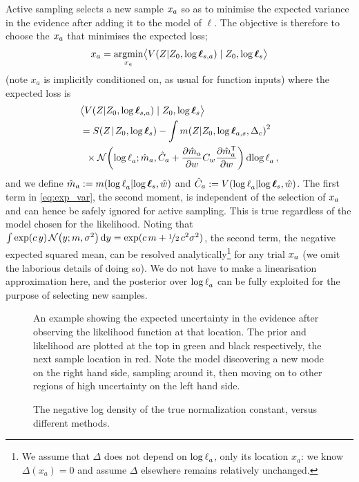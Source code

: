 \documentclass{article}
\begin{document}
Active sampling selects a new sample $\lfv_a$ so as to minimise the expected variance in the evidence after adding it to the model of $\ell$.  The objective is therefore to choose the $\lfv_a$ that minimises the expected loss;
%
\begin{align}
\lfv_a = \argmin_{\lfv_a} \bigl\langle \cov{\If}{Z_0,\tvr_{s,a}}\mid Z_0,\tvr_{s}\bigr\rangle 
\end{align}
(note $x_a$ is implicitly conditioned on, as usual for function inputs) where the expected loss is
\begin{align}
&\bigl\langle \cov{\If}{Z_0,\tvr_{s,a}}\mid Z_0,\tvr_{s}\bigr\rangle 
\nonumber\\
 & = \secm{\If}{Z_0,\tvr_s} 
 - \int\mean{\If}{Z_0,\tvr_{a,s},\Delta_c}^2\nonumber\\
& \hspace{0.2cm}
\times\N{\tr_a}
{\hat{m}_a }
{\hat{C}_a +\pderiv{\hat{m}_a}{w}C_w\pderiv{\hat{m}\tra_a}{w}}
\ud\tr_a\,,\label{eq:exp_var}
\end{align}
and we define
$\hat{m}_a \deq \mean{\tr_a}{\tvr_s,\hat{w}}$
and
$\hat{C}_a \deq \cov{\tr_a}{\tvr_s,\hat{w}}$.
The first term in \eqref{eq:exp_var}, the second moment, is independent of the selection of $\lfv_a$ and can hence  be safely ignored for active sampling. This is true regardless of the model chosen for the likelihood. 
Noting that $\int \exp(c\, y)\, \N{y}{m}{\sigma^2} \ud y = \exp(c\, m + \nicefrac{1}{2}\, c^2 \sigma^2)$, 
the second term, the negative expected squared mean, can be resolved analytically\footnote{We assume that $\Delta$ does not depend on $\tr_a$, only its location $x_a$: we know $\Delta(x_a) = 0$ and assume $\Delta$ elsewhere remains relatively unchanged.}
 for any trial $\lfv_a$ (we omit the laborious details of doing so). We do not have to make a linearisation approximation here, and the posterior over $\tr_a$ can be fully exploited for the purpose of selecting new samples.
%
 \begin{figure}
 \centering
{}
 \caption{An example showing the expected uncertainty in the evidence after observing the likelihood function at that location. The prior and likelihood are plotted at the top in green and black respectively, the next sample location in red.  Note the model discovering a new mode on the right hand side, sampling around it, then moving on to other regions of high uncertainty on the left hand side. }
 \label{fig:eue}
 \end{figure}
%
\begin{figure}
	\caption{The negative log density of the true normalization constant, versus different methods.}
\label{fig:nll}
\end{figure}
\end{document}
